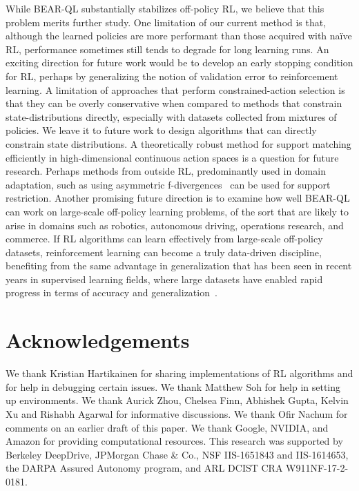 While BEAR-QL substantially stabilizes off-policy RL, we believe that this problem merits further study. One limitation of our current method is that, although the learned policies are more performant than those acquired with na\"{i}ve RL, performance sometimes still tends to degrade for long learning runs. An exciting direction for future work would be to develop an early stopping condition for RL, perhaps by generalizing the notion of validation error to reinforcement learning. {A limitation of approaches that perform constrained-action selection is that they can be overly conservative when compared to methods that constrain state-distributions directly, especially with datasets collected from mixtures of policies. We leave it to future work to design algorithms that can directly constrain state distributions. A theoretically robust method for support matching efficiently in high-dimensional continuous action spaces is a question for future research. Perhaps methods from outside RL, predominantly used in domain adaptation, such as using asymmetric f-divergences~\citep{wu19domain} can be used for support restriction.} Another promising future direction is to examine how well BEAR-QL can work on large-scale off-policy learning problems, of the sort that are likely to arise in domains such as robotics, autonomous driving, operations research, and commerce. If RL algorithms can learn effectively from large-scale off-policy datasets, reinforcement learning can become a truly data-driven discipline, benefiting from the same advantage in generalization that has been seen in recent years in supervised learning fields, where large datasets have enabled rapid progress in terms of accuracy and generalization~\cite{imagenet_cvpr09}.

\section*{Acknowledgements}
We thank Kristian Hartikainen for sharing implementations of RL algorithms and for help in debugging certain issues. We thank Matthew Soh for help in setting up environments. We thank Aurick Zhou, Chelsea Finn, Abhishek Gupta, Kelvin Xu and Rishabh Agarwal for informative discussions. We thank Ofir Nachum for comments on an earlier draft of this paper. We thank Google, NVIDIA, and Amazon for providing computational resources. This research was supported by Berkeley DeepDrive, JPMorgan Chase \& Co., NSF IIS-1651843 and IIS-1614653, the DARPA Assured Autonomy program, and ARL DCIST CRA W911NF-17-2-0181.